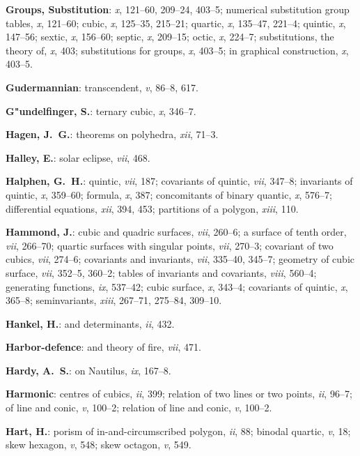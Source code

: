\documentclass[11pt,a4paper]{article}
\newcommand{\IndexEntry}[1]{\textbf{#1}}
\newcommand{\V}[1]{\textit{#1}} %
\begin{document}
\IndexEntry{Groups, Substitution}: \V{x}, 121--60, 209--24, 403--5; numerical substitution group tables, \V{x}, 121--60; cubic, \V{x}, 125--35, 215--21; quartic, \V{x}, 135--47, 221--4; quintic, \V{x}, 147--56; sextic, \V{x}, 156--60; septic, \V{x}, 209--15; octic, \V{x}, 224--7; substitutions, the theory of, \V{x}, 403; substitutions for groups, \V{x}, 403--5; in graphical construction, \V{x}, 403--5.

\IndexEntry{Gudermannian}: transcendent, \V{v}, 86--8, 617.

\IndexEntry{G"undelfinger, S.}: ternary cubic, \V{x}, 346--7.

\IndexEntry{Hagen, J.\ G.}: theorems on polyhedra, \V{xii}, 71--3.

\IndexEntry{Halley, E.}: solar eclipse, \V{vii}, 468.

\IndexEntry{Halphen, G.\ H.}: quintic, \V{vii}, 187; covariants of quintic, \V{vii}, 347--8; invariants of quintic, \V{x}, 359--60; formula, \V{x}, 387; concomitants of binary quantic, \V{x}, 576--7; differential equations, \V{xii}, 394, 453; partitions of a polygon, \V{xiii}, 110.

\IndexEntry{Hammond, J.}: cubic and quadric surfaces, \V{vii}, 260--6; a surface of tenth order, \V{vii}, 266--70; quartic surfaces with singular points, \V{vii}, 270--3; covariant of two cubics, \V{vii}, 274--6; covariants and invariants, \V{vii}, 335--40, 345--7; geometry of cubic surface, \V{vii}, 352--5, 360--2; tables of invariants and covariants, \V{viii}, 560--4; generating functions, \V{ix}, 537--42; cubic surface, \V{x}, 343--4; covariants of quintic, \V{x}, 365--8; seminvariants, \V{xiii}, 267--71, 275--84, 309--10.

\newpage

\setcounter{page}{102}

\IndexEntry{Hankel, H.}: and determinants, \V{ii}, 432.

\IndexEntry{Harbor-defence}: and theory of fire, \V{vii}, 471.

\IndexEntry{Hardy, A.\ S.}: on Nautilus, \V{ix}, 167--8.

\IndexEntry{Harmonic}: centres of cubics, \V{ii}, 399; relation of two lines or two points, \V{ii}, 96--7; of line and conic, \V{v}, 100--2; relation of line and conic, \V{v}, 100--2.

\IndexEntry{Hart, H.}: porism of in-and-circumscribed polygon, \V{ii}, 88; binodal quartic, \V{v}, 18; skew hexagon, \V{v}, 548; skew octagon, \V{v}, 549.
\end{document}
